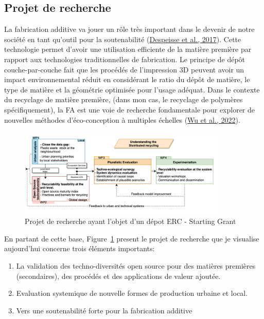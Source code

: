 \documentclass[
  11pt,
]{article}
\providecommand{\tightlist}{%
  \setlength{\itemsep}{0pt}\setlength{\parskip}{0pt}}\usepackage{longtable,booktabs,array}
\begin{document}
\hypertarget{projet-de-recherche}{%
\subsection{Projet de recherche}\label{projet-de-recherche}}

La fabrication additive va jouer un rôle très important dans le devenir
de notre société en tant qu'outil pour la soutenabilité
(\protect\hyperlink{ref-Despeisse2016}{Despeisse et al., 2017}). Cette
technologie permet d'avoir une utilisation efficiente de la matière
première par rapport aux technologies traditionnelles de fabrication. Le
principe de dépôt couche-par-couche fait que les procédés de
l'impression 3D peuvent avoir un impact environnemental réduit en
considérant le ratio du dépôt de matière, le type de matière et la
géométrie optimisée pour l'usage adéquat. Dans le contexte du recyclage
de matière première, (dans mon cas, le recyclage de polymères
spécifiquement), la FA est une voie de recherche fondamentale pour
explorer de nouvelles méthodes d'éco-conception à multiples échelles
(\protect\hyperlink{ref-Wu2021a}{Wu et al., 2022}).

\begin{figure}[H]

{\centering \includegraphics[width=0.9\textwidth,height=\textheight]{Figures/Projet-recherche.png}

}

\caption{\label{fig-projet-recherche}Projet de recherche ayant l'objet
d'un dépot ERC - Starting Grant}

\end{figure}

En partant de cette base, Figure~\ref{fig-projet-recherche} present le
projet de recherche que je visualise aujourd'hui concerne trois éléments
importants:

\begin{enumerate}
\def\labelenumi{\arabic{enumi}.}
\tightlist
\item
  La validation des techno-diversités open source pour des matières
  premières (secondaires), des procédés et des applications de valeur
  ajoutée.
\item
  Evaluation systemique de nouvelle formes de production urbaine et
  local.
\item
  Vers une soutenabilité forte pour la fabrication additive
\end{enumerate}
\end{document}

